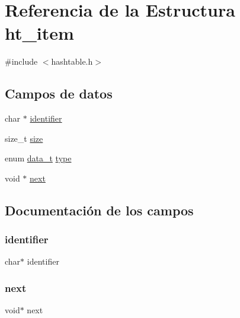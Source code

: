 \hypertarget{structht__item}{}\section{Referencia de la Estructura ht\+\_\+item}
\label{structht__item}


{\ttfamily \#include $<$hashtable.\+h$>$}

\subsection*{Campos de datos}
\begin{DoxyCompactItemize}
\item 
char $\ast$ \mbox{\hyperlink{structht__item_af5351a0143adaf16c64b881aee01d893}{identifier}}
\item 
size\+\_\+t \mbox{\hyperlink{structht__item_a854352f53b148adc24983a58a1866d66}{size}}
\item 
enum \mbox{\hyperlink{hashtable_8h_adb5f3584b941a8dc0fed6b7302b4b8eb}{data\+\_\+t}} \mbox{\hyperlink{structht__item_a0c6169f5c94682132bbbe974784559e6}{type}}
\item 
void $\ast$ \mbox{\hyperlink{structht__item_a75b19ffcca77bfc647ff02695958fd95}{next}}
\end{DoxyCompactItemize}


\subsection{Documentación de los campos}
\mbox{\label{structht__item_af5351a0143adaf16c64b881aee01d893}} 
\subsubsection{\texorpdfstring{identifier}{identifier}}
{\footnotesize\ttfamily char$\ast$ identifier}

\mbox{\label{structht__item_a75b19ffcca77bfc647ff02695958fd95}} 
\subsubsection{\texorpdfstring{next}{next}}
{\footnotesize\ttfamily void$\ast$ next}

